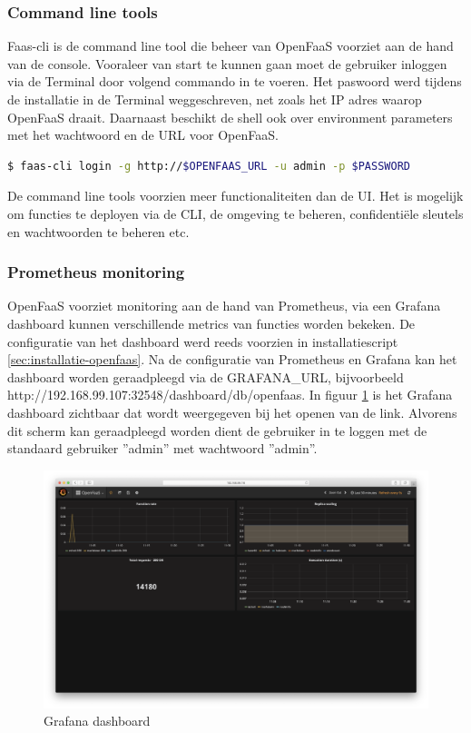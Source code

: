 \subsubsection{Command line tools}
Faas-cli is de command line tool die beheer van OpenFaaS voorziet aan de hand van de console. Vooraleer van start te kunnen gaan moet de gebruiker inloggen via de Terminal door volgend commando in te voeren. Het paswoord werd tijdens de installatie in de Terminal weggeschreven, net zoals het IP adres waarop OpenFaaS draait. Daarnaast beschikt de shell ook over environment parameters met het wachtwoord en de URL voor OpenFaaS.
\begin{lstlisting}[language=bash]
$ faas-cli login -g http://$OPENFAAS_URL -u admin -p $PASSWORD
\end{lstlisting}
De command line tools voorzien meer functionaliteiten dan de UI. Het is mogelijk om functies te deployen via de CLI, de omgeving te beheren, confidentiële sleutels en wachtwoorden te beheren etc.

\subsubsection{Prometheus monitoring}
OpenFaaS voorziet monitoring aan de hand van Prometheus, via een Grafana dashboard kunnen verschillende metrics van functies worden bekeken. De configuratie van het dashboard werd reeds voorzien in installatiescript \ref{sec:installatie-openfaas}. Na de configuratie van Prometheus en Grafana kan het dashboard worden geraadpleegd via de GRAFANA\_URL, bijvoorbeeld http://192.168.99.107:32548/dashboard/db/openfaas. In figuur \ref{fig:grafana-dashboard} is het Grafana dashboard zichtbaar dat wordt weergegeven bij het openen van de link. Alvorens dit scherm kan geraadpleegd worden dient de gebruiker in te loggen met de standaard gebruiker ''admin'' met wachtwoord ''admin''.
\begin{figure}
    \includegraphics[width=1\textwidth]{img/grafana-dashboard.png}
    \caption{Grafana dashboard}
    \label{fig:grafana-dashboard}  
\end{figure}

